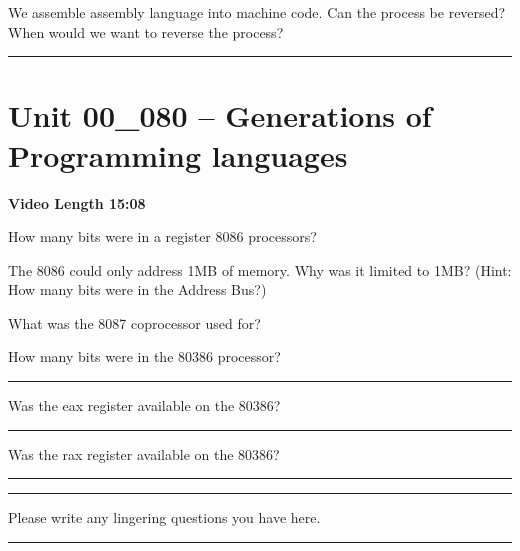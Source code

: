 \documentclass[letterpaper,12pt]{exam}
\newcommand{\unit}{Unit 00}
\begin{document}
\begin{questions}
\begin{samepage}
     \question We assemble assembly language into machine code.  Can the process be reversed?  When would we want to reverse the process?
     \vspace{5mm}
 \end{samepage}
 

 \rule{0.5\textwidth}{.4pt} %
\section*{\unit\_080 -- Generations of Programming languages}
\par{\selectfont\textbf{Video Length 15:08}}
\begin{samepage}
    \question How many bits were in a register 8086 processors?  
    \vspace{5mm}
\end{samepage}
\begin{samepage}
    \question The 8086 could only address 1MB of memory.  Why was it limited to 1MB? (Hint: How many bits were in the Address Bus?)
    \vspace{5mm}
\end{samepage}
\par
\begin{samepage}
    \question What was the 8087 coprocessor used for?
    \vspace{5mm}
\end{samepage}


  \begin{samepage}
      \question How many bits were in the 80386 processor? \rule{1cm}{0.15mm}
        \vspace{5mm}
      \par Was the eax register available on the 80386? \rule{1cm}{0.15mm}
       \vspace{5mm}
      \par Was the rax register available on the 80386? \rule{1cm}{0.15mm}
  \end{samepage}


\begin{center}
    \rule{0.5\textwidth}{.4pt}
\end{center}
Please write any lingering questions you have here.
  
\rule{0.5\textwidth}{.4pt} %
\end{questions}
\end{document}
